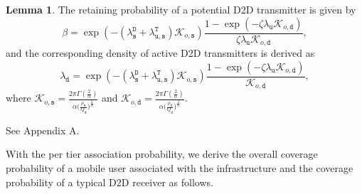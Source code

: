 \documentclass[twocolumn,english]{IEEEtran}
\theoremstyle{plain}
\theoremstyle{definition}
\newtheorem{lemma}{\textbf{Lemma}}
\begin{document}
\begin{lemma}

The retaining probability of a potential D2D transmitter is given
by
\begin{equation}
\beta=\exp\left(-\left(\lambda_{\mathtt{s}}^{\mathtt{D}}+\lambda_{\mathtt{u,s}}^{\mathtt{T}}\right)\mathcal{K}_{o,\mathtt{s}}\right)\frac{1-\exp\left(-\zeta\lambda_{\mathtt{u}}\mathcal{K}_{o,\mathtt{d}}\right)}{\zeta\lambda_{\mathtt{u}}\mathcal{K}_{o,\mathtt{d}}},\label{eq:D2D_activity}
\end{equation}
and the corresponding density of active D2D transmitters is derived
as
\begin{equation}
\lambda_{\mathtt{d}}=\exp\left(-\left(\lambda_{\mathtt{s}}^{\mathtt{D}}+\lambda_{\mathtt{u,s}}^{\mathtt{T}}\right)\mathcal{K}_{o,\mathtt{s}}\right)\frac{1-\exp\left(-\zeta\lambda_{\mathtt{u}}\mathcal{K}_{o,\mathtt{d}}\right)}{\mathcal{K}_{o,\mathtt{d}}},\label{eq:D2D_dens}
\end{equation}
where $\mathcal{K}_{o,\mathtt{s}}=\frac{2\pi\Gamma\left(\frac{2}{\alpha}\right)}{\alpha\bigl(\frac{\rho_{\mathtt{s}}}{Q_{\mathtt{d}}}\bigr)^{\frac{2}{\alpha}}}$
and $\mathcal{K}_{o,\mathtt{d}}=\frac{2\pi\Gamma\left(\frac{2}{\alpha}\right)}{\alpha\bigl(\frac{\rho_{\mathtt{d}}}{Q_{\mathtt{d}}}\bigr)^{\frac{2}{\alpha}}}$.
\begin{IEEEproof}
See Appendix A.
\end{IEEEproof}
\end{lemma}

With the per tier association probability, we derive the overall coverage
probability of a mobile user associated with the infrastructure and
the coverage probability of a typical D2D receiver as follows.
\end{document}
